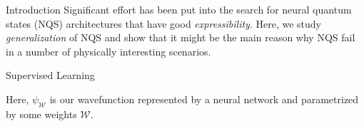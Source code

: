 \documentclass[final]{beamer}
\begin{document}
\begin{textblock}{4.6}
\begin{block}{Introduction}
        Significant effort has been put into the search for neural quantum states (NQS)
        architectures that have good \emph{expressibility}. Here, we study
        \emph{generalization} of NQS and show that it might be the main reason
        why NQS fail in a number of physically interesting scenarios.
    \end{block}

    \begin{block}{Supervised Learning}
        \begin{algorithm}[H]
            \vspace{0.5cm}
        \end{algorithm}
        Here, $\psi_\mathcal{W}$ is our wavefunction represented by a neural
        network and parametrized by some weights $\mathcal{W}$.
    \end{block}
\end{textblock}
\end{document}
